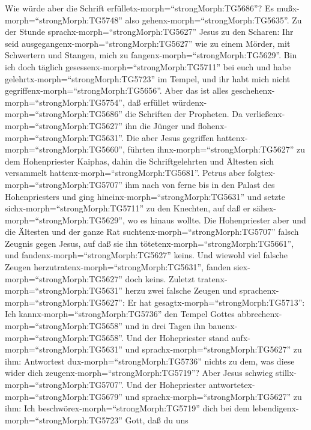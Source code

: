  Wie würde aber die Schrift
erfülletx-morph=``strongMorph:TG5686''? Es
mußx-morph=``strongMorph:TG5748'' also
gehenx-morph=``strongMorph:TG5635''.  Zu der Stunde
sprachx-morph=``strongMorph:TG5627'' Jesus zu den Scharen: Ihr seid
ausgegangenx-morph=``strongMorph:TG5627'' wie zu einem Mörder, mit
Schwertern und Stangen, mich zu fangenx-morph=``strongMorph:TG5629''.
Bin ich doch täglich gesessenx-morph=``strongMorph:TG5711'' bei euch und
habe gelehrtx-morph=``strongMorph:TG5723'' im Tempel, und ihr habt mich
nicht gegriffenx-morph=``strongMorph:TG5656''.  Aber das
ist alles geschehenx-morph=``strongMorph:TG5754'', daß erfüllet
würdenx-morph=``strongMorph:TG5686'' die Schriften der Propheten. Da
verließenx-morph=``strongMorph:TG5627'' ihn die Jünger und
flohenx-morph=``strongMorph:TG5631''.  Die aber Jesus
gegriffen hattenx-morph=``strongMorph:TG5660'', führten
ihnx-morph=``strongMorph:TG5627'' zu dem Hohenpriester Kaiphas, dahin
die Schriftgelehrten und Ältesten sich versammelt
hattenx-morph=``strongMorph:TG5681''.  Petrus aber
folgtex-morph=``strongMorph:TG5707'' ihm nach von ferne bis in den
Palast des Hohenpriesters und ging hineinx-morph=``strongMorph:TG5631''
und setzte sichx-morph=``strongMorph:TG5711'' zu den Knechten, auf daß
er sähex-morph=``strongMorph:TG5629'', wo es hinaus wollte.
 Die Hohenpriester aber und die Ältesten und der ganze Rat
suchtenx-morph=``strongMorph:TG5707'' falsch Zeugnis gegen Jesus, auf
daß sie ihn tötetenx-morph=``strongMorph:TG5661'',  und
fandenx-morph=``strongMorph:TG5627'' keins. Und wiewohl viel falsche
Zeugen herzutratenx-morph=``strongMorph:TG5631'', fanden
siex-morph=``strongMorph:TG5627'' doch keins. Zuletzt
tratenx-morph=``strongMorph:TG5631'' herzu zwei falsche Zeugen
 und sprachenx-morph=``strongMorph:TG5627'': Er hat
gesagtx-morph=``strongMorph:TG5713'': Ich
kannx-morph=``strongMorph:TG5736'' den Tempel Gottes
abbrechenx-morph=``strongMorph:TG5658'' und in drei Tagen ihn
bauenx-morph=``strongMorph:TG5658''.  Und der Hohepriester
stand aufx-morph=``strongMorph:TG5631'' und
sprachx-morph=``strongMorph:TG5627'' zu ihm: Antwortest
dux-morph=``strongMorph:TG5736'' nichts zu dem, was diese wider dich
zeugenx-morph=``strongMorph:TG5719''?  Aber Jesus schwieg
stillx-morph=``strongMorph:TG5707''. Und der Hohepriester
antwortetex-morph=``strongMorph:TG5679'' und
sprachx-morph=``strongMorph:TG5627'' zu ihm: Ich
beschwörex-morph=``strongMorph:TG5719'' dich bei dem
lebendigenx-morph=``strongMorph:TG5723'' Gott, daß du uns
